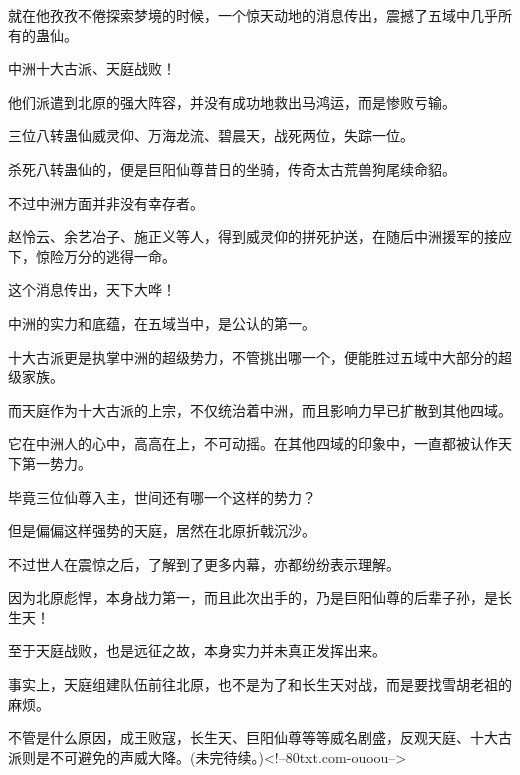 \begin{this_body}
就在他孜孜不倦探索梦境的时候，一个惊天动地的消息传出，震撼了五域中几乎所有的蛊仙。

中洲十大古派、天庭战败！

他们派遣到北原的强大阵容，并没有成功地救出马鸿运，而是惨败亏输。

三位八转蛊仙威灵仰、万海龙流、碧晨天，战死两位，失踪一位。

杀死八转蛊仙的，便是巨阳仙尊昔日的坐骑，传奇太古荒兽狗尾续命貂。

不过中洲方面并非没有幸存者。

赵怜云、余艺冶子、施正义等人，得到威灵仰的拼死护送，在随后中洲援军的接应下，惊险万分的逃得一命。

这个消息传出，天下大哗！

中洲的实力和底蕴，在五域当中，是公认的第一。

十大古派更是执掌中洲的超级势力，不管挑出哪一个，便能胜过五域中大部分的超级家族。

而天庭作为十大古派的上宗，不仅统治着中洲，而且影响力早已扩散到其他四域。

它在中洲人的心中，高高在上，不可动摇。在其他四域的印象中，一直都被认作天下第一势力。

毕竟三位仙尊入主，世间还有哪一个这样的势力？

但是偏偏这样强势的天庭，居然在北原折戟沉沙。

不过世人在震惊之后，了解到了更多内幕，亦都纷纷表示理解。

因为北原彪悍，本身战力第一，而且此次出手的，乃是巨阳仙尊的后辈子孙，是长生天！

至于天庭战败，也是远征之故，本身实力并未真正发挥出来。

事实上，天庭组建队伍前往北原，也不是为了和长生天对战，而是要找雪胡老祖的麻烦。

不管是什么原因，成王败寇，长生天、巨阳仙尊等等威名剧盛，反观天庭、十大古派则是不可避免的声威大降。(未完待续。)<!--80txt.com-ouoou-->

\end{this_body}

